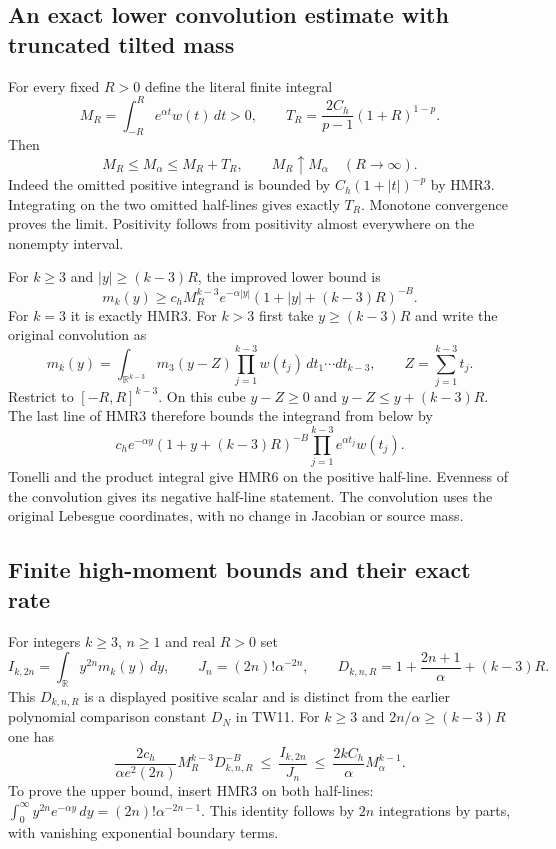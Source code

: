 \subsection{An exact lower convolution estimate with truncated tilted mass}

For every fixed $R>0$ define the literal finite integral
\[
 M_R=\int_{-R}^{R}e^{\alpha t}w(t)\,dt>0,\qquad
 T_R=\frac{2C_h}{p-1}(1+R)^{1-p}.
 \tag{HMR4}
\]
Then
\[
 M_R\leq M_\alpha\leq M_R+T_R,\qquad
 M_R\uparrow M_\alpha\quad(R\longrightarrow\infty).
 \tag{HMR5}
\]
Indeed the omitted positive integrand is bounded by
$C_h(1+|t|)^{-p}$ by HMR3. Integrating on the two omitted
half-lines gives exactly $T_R$. Monotone convergence proves
the limit. Positivity follows from positivity almost everywhere
on the nonempty interval.

For $k\geq3$ and $|y|\geq(k-3)R$, the improved lower bound is
\[
 \boxed{\displaystyle
 m_k(y)\geq c_h M_R^{k-3}e^{-\alpha|y|}
                  (1+|y|+(k-3)R)^{-B}.}
 \tag{HMR6}
\]
For $k=3$ it is exactly HMR3. For $k>3$ first take
$y\geq(k-3)R$ and write the original convolution as
\[
 m_k(y)=\int_{\mathbb R^{k-3}}
       m_3(y-Z)\prod_{j=1}^{k-3}w(t_j)\,dt_1\cdots dt_{k-3},
 \qquad Z=\sum_{j=1}^{k-3}t_j.
\]
Restrict to $[-R,R]^{k-3}$. On this cube
$y-Z\geq0$ and $y-Z\leq y+(k-3)R$. The last line of HMR3
therefore bounds the integrand from below by
\[
 c_he^{-\alpha y}(1+y+(k-3)R)^{-B}
                    \prod_{j=1}^{k-3}e^{\alpha t_j}w(t_j).
\]
Tonelli and the product integral give HMR6 on the positive
half-line. Evenness of the convolution gives its negative
half-line statement. The convolution uses the original
Lebesgue coordinates, with no change in Jacobian or source mass.

\subsection{Finite high-moment bounds and their exact rate}

For integers $k\geq3$, $n\geq1$ and real $R>0$ set
\[
 I_{k,2n}=\int_{\mathbb R}y^{2n}m_k(y)\,dy,\qquad
 J_n=(2n)!\alpha^{-2n},\qquad
 D_{k,n,R}=1+\frac{2n+1}{\alpha}+(k-3)R.
 \tag{HMR7}
\]
This $D_{k,n,R}$ is a displayed positive scalar and is distinct
from the earlier polynomial comparison constant $D_N$ in TW11.
For $k\geq3$ and $2n/\alpha\geq(k-3)R$ one has
\[
 \boxed{\displaystyle
 \frac{2c_h}{\alpha e^2(2n)}
       M_R^{k-3}D_{k,n,R}^{-B}
 \ \leq\ \frac{I_{k,2n}}{J_n}\
 \leq\ \frac{2kC_h}{\alpha}M_\alpha^{k-1}.}
 \tag{HMR8}
\]
To prove the upper bound, insert HMR3 on both half-lines:
$\int_0^\infty y^{2n}e^{-\alpha y}\,dy
=(2n)!\alpha^{-2n-1}$. This identity follows by
$2n$ integrations by parts, with vanishing exponential
boundary terms.

